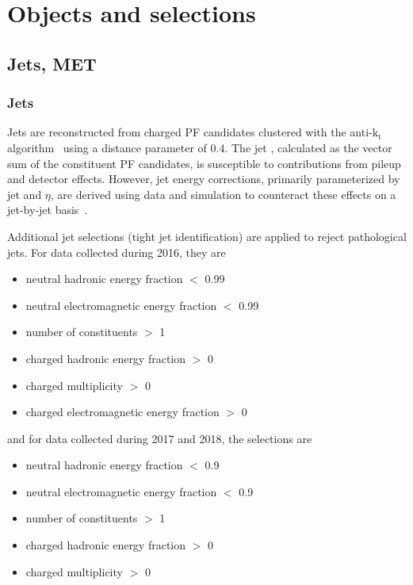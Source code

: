 \chapter{Objects and selections}

\section{Jets, MET}

\subsection{Jets}
Jets are reconstructed from charged PF candidates clustered with the
anti-$\mathrm{k_t}$ algorithm~\cite{CMS:Cacciari2008gp, CMS:Cacciari2011ma}
using a distance parameter of 0.4. The jet \pt, calculated as the vector sum
of the constituent PF candidates, is susceptible to contributions from pileup
and detector effects. However, jet energy corrections, primarily
parameterized by jet \pt and $\eta$, are derived using data and simulation to
counteract these effects on a jet-by-jet basis~\cite{CMS:Khachatryan2016kdb, CMS:PASJME16003}.

Additional jet selections (tight jet identification) are applied to reject
pathological jets. For data collected during 2016, they are
\begin{itemize}
    \item neutral hadronic energy fraction $<$ 0.99
    \item neutral electromagnetic energy fraction $<$ 0.99
    \item number of constituents $>$ 1
    \item charged hadronic energy fraction $>$ 0
    \item charged multiplicity $>$ 0
    \item charged electromagnetic energy fraction $>$ 0
\end{itemize}
\noindent and for data collected during 2017 and 2018, the selections are
\begin{itemize}
    \item neutral hadronic energy fraction $<$ 0.9
    \item neutral electromagnetic energy fraction $<$ 0.9
    \item number of constituents $>$ 1
    \item charged hadronic energy fraction $>$ 0
    \item charged multiplicity $>$ 0
\end{itemize}


